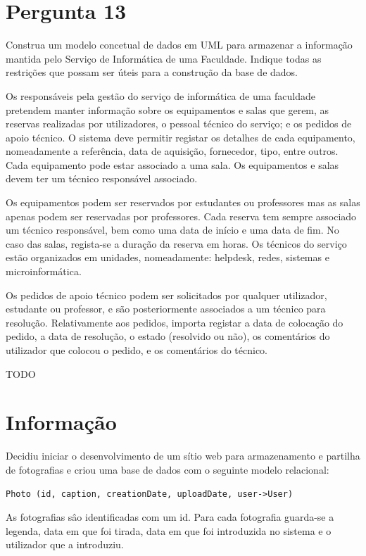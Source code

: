 \documentclass[type=normal, year=2014/15]{bdad_exam}
\begin{document}
{\section{Pergunta 13}
Construa um modelo concetual de dados em UML para armazenar a informação mantida pelo Serviço de Informática de uma Faculdade. Indique todas as restrições que possam ser úteis para a construção da base de dados.

Os responsáveis pela gestão do serviço de informática de uma faculdade pretendem manter informação sobre os equipamentos e salas que gerem, as reservas realizadas por utilizadores, o pessoal técnico do serviço; e os pedidos de apoio técnico. O sistema deve permitir registar os detalhes de cada equipamento, nomeadamente a referência, data de aquisição, fornecedor, tipo, entre outros. Cada equipamento pode estar associado a uma sala. Os equipamentos e salas devem ter um técnico responsável associado.

Os equipamentos podem ser reservados por estudantes ou professores mas as salas apenas podem ser reservadas por professores. Cada reserva tem sempre associado um técnico responsável, bem como uma data de início e uma data de fim. No caso das salas, regista-se a duração da reserva em horas. Os técnicos do serviço estão organizados em unidades, nomeadamente: helpdesk, redes, sistemas e microinformática.

Os pedidos de apoio técnico podem ser solicitados por qualquer utilizador, estudante ou professor, e são posteriormente associados a um técnico para resolução. Relativamente aos pedidos, importa registar a data de colocação do pedido, a data de resolução, o estado (resolvido ou não), os comentários do utilizador que colocou o pedido, e os comentários do técnico.

\ansseparator

TODO

\section*{Informação}
Decidiu iniciar o desenvolvimento de um sítio web para armazenamento e partilha de fotografias e criou uma base de dados com o seguinte modelo relacional:

\begin{lstlisting}[numbers=none]
Photo (id, caption, creationDate, uploadDate, user->User)
\end{lstlisting}

As fotografias sâo identificadas com um id. Para cada fotografia guarda-se a legenda, data em que foi tirada, data em que foi introduzida no sistema e o utilizador que a introduziu.

}
\end{document}
